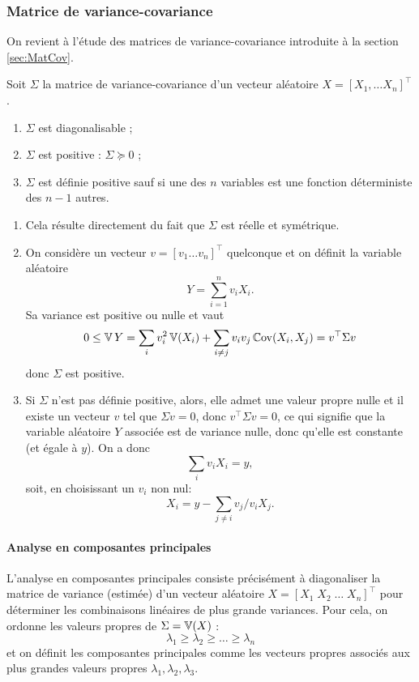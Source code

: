 \subsubsection{Matrice de variance-covariance}

On revient à l'étude des matrices de variance-covariance introduite à la section \ref{sec:MatCov}.

\begin{proposition*}
  Soit $\Sigma$ la matrice de variance-covariance d'un vecteur aléatoire $X = [X_1, \dots X_n]^\top$.
  \begin{enumerate}
    \item $\Sigma$ est diagonalisable ;
    \item $\Sigma$ est positive : $\Sigma \succcurlyeq 0$ ;
    \item $\Sigma$ est définie positive sauf si une des $n$ variables est une fonction déterministe des $n-1$ autres.
  \end{enumerate}
\end{proposition*}

\proof
\begin{enumerate}
\item Cela résulte directement du fait que $\Sigma$ est réelle et symétrique.
\item On considère un vecteur $v = [v_1 \dots v_n]^\top$ quelconque et on définit la variable aléatoire 
$$
Y = \sum_{i=1}^n v_i X_i.
$$
Sa variance est positive ou nulle et vaut
$$
0 \leq \operatorname{\mathbb{V}} Y 
= \sum_i v_i^2 \operatorname{\mathbb{V}}(X_i) + \sum_{i \neq j} v_i v_j \operatorname{\mathbb{C}ov}(X_i, X_j)
= v^\top \Sigma v
$$
donc $\Sigma$ est positive.
\item Si $\Sigma$  n'est pas définie positive, alors, elle admet une valeur propre nulle et il existe un vecteur $v$ tel que $\Sigma v = 0$, donc $v^\top \Sigma v = 0$, ce qui signifie que la variable aléatoire $Y$ associée est de variance nulle, donc qu'elle est constante (et égale à $y$). On a donc
$$
\sum_i v_i X_i = y,
$$
soit, en choisissant un $v_i$ non nul: 
$$
X_i = y - \sum_{j \neq i} v_j/v_i X_j.
$$
\end{enumerate}
\eproof

\paragraph*{Analyse en composantes principales} 
L'analyse en composantes principales consiste précisément à diagonaliser la matrice de variance (estimée) d'un vecteur aléatoire $X = [X_1 \; X_2 \; \dots \; X_n]^\top$ pour déterminer les combinaisons linéaires de plus grande variances. Pour cela, on ordonne les valeurs propres de $\Sigma = \operatorname{\mathbb{V}}(X)$ : 
$$
\lambda_1 \geq \lambda_2 \geq \dots \geq \lambda_n
$$
et on définit les composantes principales comme les vecteurs propres associés aux plus grandes valeurs propres $\lambda_1, \lambda_2, \lambda_3$.

